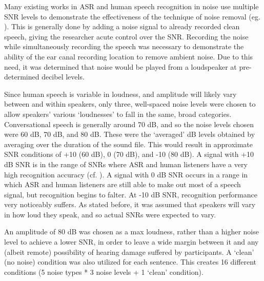 Many existing works in ASR and human speech recognition in noise use multiple SNR levels to demonstrate the effectiveness of the technique of noise removal (eg. \cite{braun:16}).  This is generally done by adding a noise signal to already recorded clean speech, giving the researcher acute control over the SNR.  Recording the noise while simultaneously recording the speech was necessary to demonstrate the ability of the ear canal recording location to remove ambient noise.  Due to this need, it was determined that noise would be played from a loudspeaker at pre-determined decibel levels.  

Since human speech is variable in loudness, and amplitude will likely vary between and within speakers, only three, well-spaced noise levels were chosen to allow speakers' various `loudnesses' to fall in the same, broad categories.  Conversational speech is generally around 70 dB, and so the noise levels chosen were 60 dB, 70 dB, and 80 dB.  These were the `averaged' dB levels obtained by averaging over the duration of the sound file.  This would result in approximate SNR conditions of +10 (60 dB), 0 (70 dB), and -10 (80 dB).  A signal with +10 dB SNR is in the range of SNRs where ASR and human listeners have a very high recognition accuracy (cf. \cite{braun:16,gilbert:13}).  A signal with 0 dB SNR occurs in a range in which ASR and human listeners are still able to make out most of a speech signal, but recognition begins to falter.  At -10 dB SNR, recognition performance very noticeably suffers.  As stated before, it was assumed that speakers will vary in how loud they speak, and so actual SNRs were expected to vary.

An amplitude of 80 dB was chosen as a max loudness, rather than a higher noise level to achieve a lower SNR, in order to leave a wide margin between it and any (albeit remote) possibility of hearing damage suffered by participants.  A `clean' (no noise) condition was also utilized for each sentence.  This creates 16 different conditions (5 noise types * 3 noise levels + 1 `clean' condition).  

